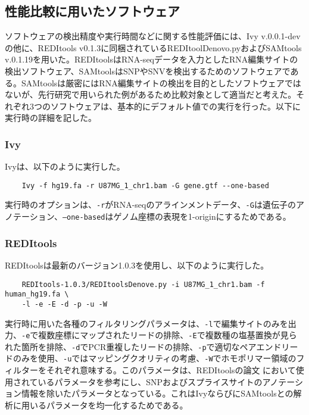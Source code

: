 \subsection{性能比較に用いたソフトウェア}
ソフトウェアの検出精度や実行時間などに関する性能評価には、Ivy v.0.0.1-devの他に、REDItools v0.1.3に同梱されているREDItoolDenovo.pyおよびSAMtools v.0.1.19を用いた。REDItoolsはRNA-seqデータを入力としたRNA編集サイトの検出ソフトウェア、SAMtoolsはSNPやSNVを検出するためのソフトウェアである。SAMtoolsは厳密にはRNA編集サイトの検出を目的としたソフトウェアではないが、先行研究で用いられた例があるため比較対象として適当だと考えた。それぞれ3つのソフトウェアは、基本的にデフォルト値での実行を行った。以下に実行時の詳細を記した。

\subsubsection{Ivy}
Ivyは、以下のように実行した。
{\small
\begin{verbatim}
	Ivy -f hg19.fa -r U87MG_1_chr1.bam -G gene.gtf --one-based
\end{verbatim}
}
実行時のオプションは、\texttt{-r}がRNA-seqのアラインメントデータ、\texttt{-G}は遺伝子のアノテーション、\texttt{--one-based}はゲノム座標の表現を1-originにするためである。

\subsubsection{REDItools}
REDItoolsは最新のバージョン1.0.3を使用し、以下のように実行した。
{\small
\begin{verbatim}
	REDItools-1.0.3/REDItoolsDenove.py -i U87MG_1_chr1.bam -f human_hg19.fa \
	-l -e -E -d -p -u -W
\end{verbatim}
}
実行時に用いた各種のフィルタリングパラメータは、\texttt{-l}で編集サイトのみを出力、\texttt{-e}で複数座標にマップされたリードの排除、\texttt{-E}で複数種の塩基置換が見られた箇所を排除、\texttt{-d}でPCR重複したリードの排除、\texttt{-p}で適切なペアエンドリードのみを使用、\texttt{-u}ではマッピングクオリティの考慮、\texttt{-W}でホモポリマー領域のフィルターをそれぞれ意味する。このパラメータは、REDItoolsの論文 \cite{Picardi:2013aa}において使用されているパラメータを参考にし、SNPおよびスプライスサイトのアノテーション情報を除いたパラメータとなっている。これはIvyならびにSAMtoolsとの解析に用いるパラメータを均一化するためである。

